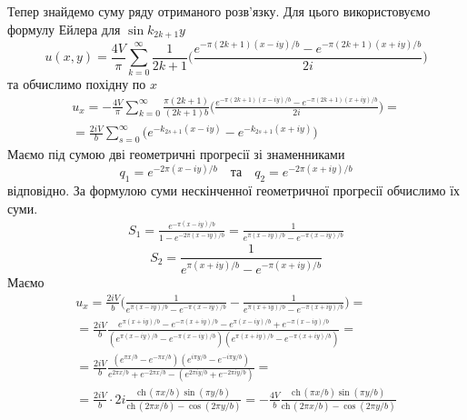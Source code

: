 Тепер знайдемо суму ряду отриманого розв'язку. Для цього використовуємо формулу Ейлера для $\sin k_{2k+1}y$ 
\begin{equation*} 
    u(x,y) = \frac{4V}{\pi} \sum_{k=0}^{\infty} \frac{1}{2k+1} \bigg( \frac{e^{-\pi(2k+1)(x - iy)/b} - e^{-\pi(2k+1)(x + iy)/b}}{2i} \bigg)
\end{equation*}
та обчислимо похідну по $x$
\begin{equation*} 
    \begin{gathered}
        u_x = -\frac{4V}{\pi} \sum_{k=0}^{\infty} \frac{\pi (2k+1)}{(2k+1)b} \bigg( \frac{e^{-\pi(2k+1)(x - iy)/b} - e^{-\pi(2k+1)(x + iy)/b}}{2i} \bigg) =\\
        = \frac{2iV}{b} \sum_{s=0}^{\infty} \bigg(e^{-k_{2s+1}(x - iy)} - e^{-k_{2s+1}(x + iy)}\bigg)
    \end{gathered}
\end{equation*}
Маємо під сумою дві геометричні прогресії зі знаменниками \[q_1 = e^{-2\pi(x - iy)/b} \quad\text{та}\quad q_2 = e^{-2\pi(x + iy)/b}\] відповідно. За формулою суми нескінченної геометричної прогресії обчислимо їх суми.
\begin{equation}
    \begin{gathered}
        S_1 = \frac{e^{-\pi(x - iy)/b}}{1 - e^{-2\pi(x - iy)/b}} = \frac{1}{e^{\pi(x - iy)/b} - e^{-\pi(x - iy)/b}}
    \end{gathered}
\end{equation}
\begin{equation}
    S_2 = \frac{1}{e^{\pi(x + iy)/b} - e^{-\pi(x + iy)/b}} 
\end{equation}
Маємо 
\begin{equation*} 
    \begin{gathered}
        u_x = \frac{2iV}{b} \bigg(\frac{1}{e^{\pi(x - iy)/b} - e^{-\pi(x - iy)/b}} - \frac{1}{e^{\pi(x + iy)/b} - e^{-\pi(x + iy)/b}}\bigg) =\\
        = \frac{2iV}{b} \frac{e^{\pi(x + iy)/b} - e^{-\pi(x + iy)/b} - e^{\pi(x - iy)/b} + e^{-\pi(x - iy)/b}}{(e^{\pi(x - iy)/b} - e^{-\pi(x - iy)/b})(e^{\pi(x + iy)/b} - e^{-\pi(x + iy)/b})} =\\
        = \frac{2iV}{b} \frac{(e^{\pi x/b} - e^{-\pi x/b})(e^{i\pi y/b} - e^{-i\pi y/b})}{e^{2\pi x/b} + e^{-2\pi x/b} - (e^{2\pi iy/b} + e^{-2\pi iy/b})} =\\
        = \frac{2iV}{b} \cdot 2i \frac{\mathrm{ch\,}(\pi x/b)\sin(\pi y/b)}{\mathrm{ch\,}(2\pi x/b) - \cos(2\pi y/b)} = -\frac{4V}{b} \frac{\mathrm{ch\,}(\pi x/b)\sin(\pi y/b)}{\mathrm{ch\,}(2\pi x/b) - \cos(2\pi y/b)}
    \end{gathered} 
\end{equation*}

